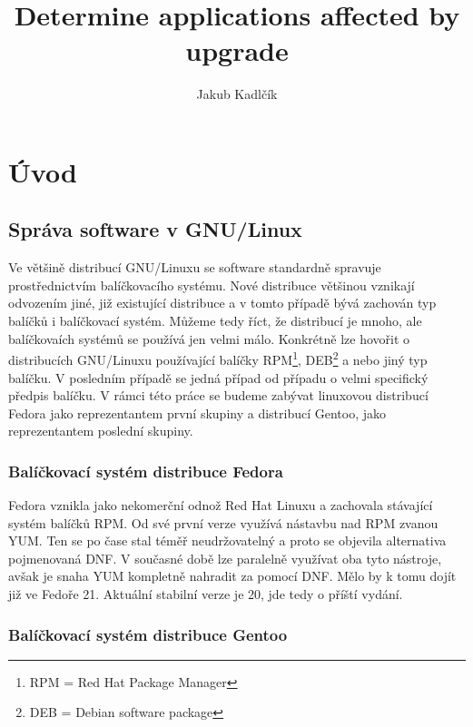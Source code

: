 \documentclass[10pt,a4paper]{article}
\title{Determine applications affected by upgrade}
\author{Jakub Kadlčík}
\begin{document}
	\maketitle
	\newpage



	\tableofcontents
	\newpage

	\section{Úvod}
		\subsection{Správa software v GNU/Linux}
		Ve většině distribucí GNU/Linuxu se software standardně spravuje prostřednictvím balíčkovacího systému. Nové distribuce většinou vznikají odvozením jiné, již existující distribuce a v tomto případě bývá zachován typ balíčků i balíčkovací systém. Můžeme tedy říct, že distribucí je mnoho, ale balíčkovaích systémů se používá jen velmi málo. Konkrétně lze hovořit o distribucích GNU/Linuxu používající balíčky RPM\footnote{RPM = Red Hat Package Manager}, DEB\footnote{DEB = Debian software package} a nebo jiný typ balíčku. V posledním případě se jedná případ od případu o velmi specifický předpis balíčku. V rámci této práce se budeme zabývat linuxovou distribucí Fedora jako reprezentantem první skupiny a distribucí Gentoo, jako reprezentantem poslední skupiny.

			\subsubsection{Balíčkovací systém distribuce Fedora}
			Fedora vznikla jako nekomerční odnož Red Hat Linuxu a zachovala stávající systém balíčků RPM\@. Od své první verze využívá nástavbu nad RPM zvanou YUM\@. Ten se po čase stal téměř neudržovatelný a proto se objevila alternativa pojmenovaná DNF\@. V současné době lze paralelně využívat oba tyto nástroje, avšak je snaha YUM kompletně nahradit za pomocí DNF\@. Mělo by k tomu dojít již ve Fedoře 21. Aktuální stabilní verze je 20, jde tedy o příští vydání.

			\subsubsection{Balíčkovací systém distribuce Gentoo}
\end{document}
